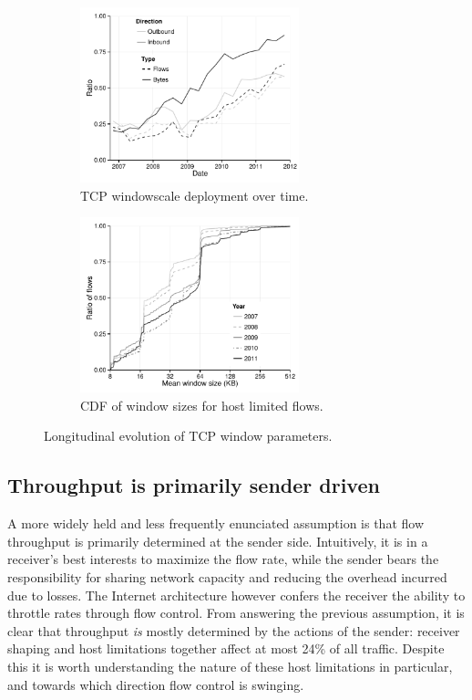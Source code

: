 \begin{figure}[t]
    \begin{subfigure}[b]{.5\linewidth}
        \centering
        \includegraphics[width=2.5in]{figures/malawi/windowscale}
        \caption{\acs{TCP} windowscale deployment over time. \label{fig:windowscale}}
    \end{subfigure}%
    \begin{subfigure}[b]{.5\linewidth}
        \centering
        \includegraphics[width=2.5in]{figures/malawi/hostwindow}
        \caption{\acs{CDF} of window sizes for host limited flows.\label{fig:hostwindow}}
    \end{subfigure}%
    \caption{Longitudinal evolution of \acs{TCP} window parameters. \label{fig:tcpWindowParams}}
\end{figure}



\subsection{Throughput is primarily sender driven}

A more widely held and less frequently enunciated assumption is that flow throughput is primarily determined at the sender side. 
Intuitively, it is in a receiver's best interests to maximize the flow rate, while the sender bears the responsibility for sharing network capacity and reducing the overhead incurred due to losses. 
The Internet architecture however confers the receiver the ability to throttle rates through flow control. 
From answering the previous assumption, it is clear that throughput \textit{is} mostly determined by the actions of the sender: receiver shaping and host limitations together affect at most 24\% of all traffic. 
Despite this it is worth understanding the nature of these host limitations in particular, and towards which direction flow control is swinging.

